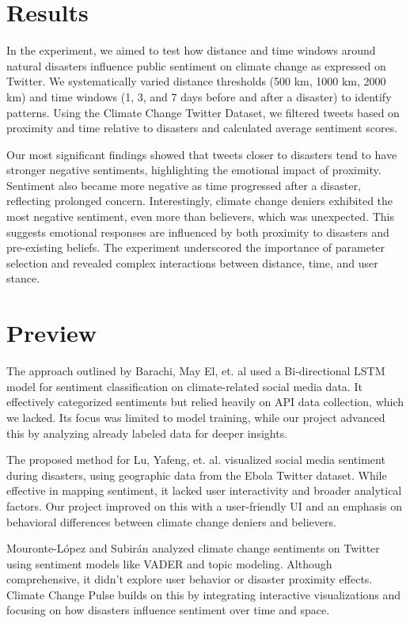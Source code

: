 \documentclass[pdflatex,sn-mathphys-num]{sn-jnl}%
\theoremstyle{thmstyleone}%
\theoremstyle{thmstyletwo}%
\theoremstyle{thmstylethree}%
\begin{document}
\section{Results}
In the experiment, we aimed to test how distance and time windows around natural disasters influence public sentiment on climate change as expressed on Twitter. We systematically varied distance thresholds (500 km, 1000 km, 2000 km) and time windows (1, 3, and 7 days before and after a disaster) to identify patterns. Using the Climate Change Twitter Dataset, we filtered tweets based on proximity and time relative to disasters and calculated average sentiment scores.

Our most significant findings showed that tweets closer to disasters tend to have stronger negative sentiments, highlighting the emotional impact of proximity. Sentiment also became more negative as time progressed after a disaster, reflecting prolonged concern. Interestingly, climate change deniers exhibited the most negative sentiment, even more than believers, which was unexpected. This suggests emotional responses are influenced by both proximity to disasters and pre-existing beliefs. The experiment underscored the importance of parameter selection and revealed complex interactions between distance, time, and user stance.

\section{Preview}
The approach outlined by Barachi, May El, et. al used a Bi-directional LSTM model for sentiment classification on climate-related social media data. It effectively categorized sentiments but relied heavily on API data collection, which we lacked. Its focus was limited to model training, while our project advanced this by analyzing already labeled data for deeper insights.

The proposed method for Lu, Yafeng, et. al. visualized social media sentiment during disasters, using geographic data from the Ebola Twitter dataset. While effective in mapping sentiment, it lacked user interactivity and broader analytical factors. Our project improved on this with a user-friendly UI and an emphasis on behavioral differences between climate change deniers and believers.

Mouronte-López and Subirán analyzed climate change sentiments on Twitter using sentiment models like VADER and topic modeling. Although comprehensive, it didn’t explore user behavior or disaster proximity effects. Climate Change Pulse builds on this by integrating interactive visualizations and focusing on how disasters influence sentiment over time and space.
\end{document}
